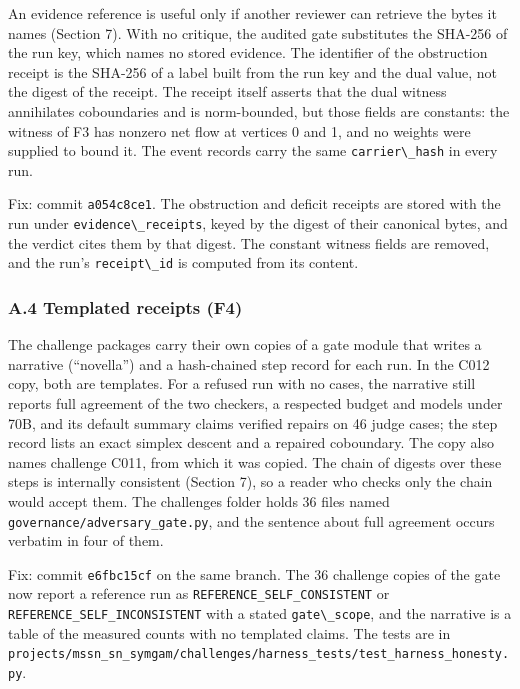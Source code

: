 \documentclass[
  11pt,
]{article}
\newcommand{\passthrough}[1]{#1}
\begin{document}
An evidence reference is useful only if another reviewer can retrieve
the bytes it names (Section 7). With no critique, the audited gate
substitutes the SHA-256 of the run key, which names no stored evidence.
The identifier of the obstruction receipt is the SHA-256 of a label
built from the run key and the dual value, not the digest of the
receipt. The receipt itself asserts that the dual witness annihilates
coboundaries and is norm-bounded, but those fields are constants: the
witness of F3 has nonzero net flow at vertices 0 and 1, and no weights
were supplied to bound it. The event records carry the same
\passthrough{\lstinline!carrier\_hash!} in every run.

Fix: commit \passthrough{\lstinline!a054c8ce1!}. The obstruction and
deficit receipts are stored with the run under
\passthrough{\lstinline!evidence\_receipts!}, keyed by the digest of
their canonical bytes, and the verdict cites them by that digest. The
constant witness fields are removed, and the run's
\passthrough{\lstinline!receipt\_id!} is computed from its content.

\subsubsection{A.4 Templated receipts
(F4)}\label{a.4-templated-receipts-f4}

The challenge packages carry their own copies of a gate module that
writes a narrative (``novella'') and a hash-chained step record for each
run. In the C012 copy, both are templates. For a refused run with no
cases, the narrative still reports full agreement of the two checkers, a
respected budget and models under 70B, and its default summary claims
verified repairs on 46 judge cases; the step record lists an exact
simplex descent and a repaired coboundary. The copy also names challenge
C011, from which it was copied. The chain of digests over these steps is
internally consistent (Section 7), so a reader who checks only the chain
would accept them. The challenges folder holds 36 files named
\nolinkurl{governance/adversary_gate.py}, and the sentence about full
agreement occurs verbatim in four of them.

Fix: commit \passthrough{\lstinline!e6fbc15cf!} on the same branch. The
36 challenge copies of the gate now report a reference run as
\nolinkurl{REFERENCE_SELF_CONSISTENT} or
\nolinkurl{REFERENCE_SELF_INCONSISTENT} with a stated
\passthrough{\lstinline!gate\_scope!}, and the narrative is a table of
the measured counts with no templated claims. The tests are in
\nolinkurl{projects/mssn_sn_symgam/challenges/harness_tests/test_harness_honesty.py}.
\end{document}
